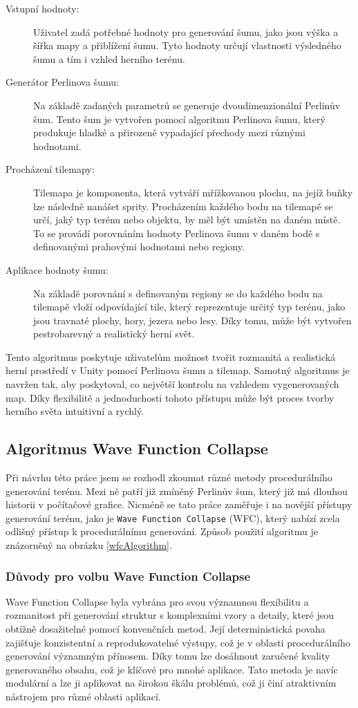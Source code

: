 \begin{description}
	\item[Vstupní hodnoty:] Uživatel zadá potřebné hodnoty pro generování šumu, jako jsou výška a šířka mapy a přiblížení šumu. Tyto hodnoty určují vlastnosti výsledného šumu a tím i vzhled herního terénu.
	\item[Generátor Perlinova šumu:] Na základě zadaných parametrů se generuje dvoudimenzionální Perlinův šum. Tento šum je vytvořen pomocí algoritmu Perlinova šumu, který produkuje hladké a přirozeně vypadající přechody mezi různými hodnotami.
	\item[Procházení tilemapy:] Tilemapa je komponenta, která vytváří mřížkovanou plochu, na jejíž buňky lze následně nanášet sprity. Procházením každého bodu na tilemapě se určí, jaký typ terénu nebo objektu, by měl být umístěn na daném místě. To se provádí porovnáním hodnoty Perlinova šumu v daném bodě s definovanými prahovými hodnotami nebo regiony.
	\item[Aplikace hodnoty šumu:] Na základě porovnání s definovaným regiony se do každého bodu na tilemapě vloží odpovídající tile, který reprezentuje určitý typ terénu, jako jsou travnaté plochy, hory, jezera nebo lesy. Díky tomu, může být vytvořen pestrobarevný a realistický herní svět.
\end{description}

Tento algoritmus poskytuje uživatelům možnost tvořit rozmanitá a realistická herní prostředí v Unity pomocí Perlinova šumu a tilemap. Samotný algoritmus je navržen tak, aby poskytoval, co největší kontrolu na vzhledem vygenerovaných map. Díky flexibilitě a jednoduchosti tohoto přístupu může být proces tvorby herního světa intuitivní a rychlý. 

\subsection{Algoritmus Wave Function Collapse}
Při návrhu této práce jsem se rozhodl zkoumat různé metody procedurálního generování terénu. Mezi ně patří již zmíněný Perlinův šum, který již má dlouhou historii v počítačové grafice. Nicméně se tato práce zaměřuje i na novější přístupy generování terénu, jako je \texttt{Wave Function Collapse} (WFC), který nabízí zcela odlišný přístup k procedurálnímu generování. Způsob použití algoritmu je znázorněný na obrázku \ref{wfcAlgorithm}.

\subsubsection{Důvody pro volbu Wave Function Collapse}
Wave Function Collapse byla vybrána pro svou významnou flexibilitu a rozmanitost při generování struktur s komplexními vzory a detaily, které jsou obtížně dosažitelné pomocí konvenčních metod. Její deterministická povaha zajišťuje konzistentní a reprodukovatelné výstupy, což je v oblasti procedurálního generování významným přínosem. Díky tomu lze dosáhnout zaručené kvality generovaného obsahu, což je klíčové pro mnohé aplikace. Tato metoda je navíc modulární a lze ji aplikovat na širokou škálu problémů, což ji činí atraktivním nástrojem pro různé oblasti aplikací.

